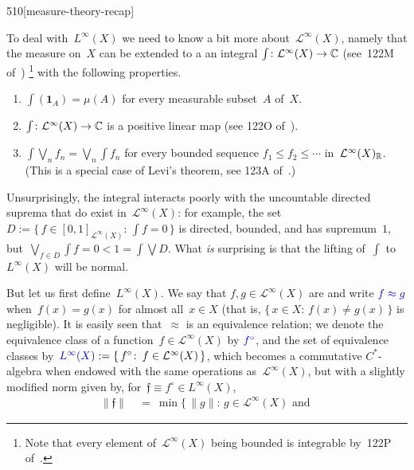 \begin{parsec}{510}[measure-theory-recap]
\begin{point}{30}
\end{point}
\begin{point}{40}%
To deal with~$L^\infty(X)$
we need to know a bit more about~$\mathcal{L}^\infty(X)$,
namely that the measure on~$X$ can be extended to a
an integral $\int\colon \mathcal{L}^\infty(X)\to \mathbb{C}$
(see~122M of~\cite{fremlin})%
\footnote{Note that every element of~$\mathcal{L}^\infty(X)$
being bounded is integrable by~122P of~\cite{fremlin}.}
with the following properties.
\begin{enumerate}
\item
$\int(\mathbf{1}_A) = \mu(A)$
for every measurable subset~$A$ of~$X$.
\item
$\int\colon \mathcal{L}^\infty(X)\to \mathbb{C}$
is a positive linear map
(see 122O of~\cite{fremlin}).
\item
$\int \bigvee_n f_n = \bigvee_n \int f_n$
for every bounded sequence
$f_1\leq f_2\leq \dotsb$
in~$\mathcal{L}^\infty(X)_{\mathbb{R}}$.
(This is a special case
of Levi's theorem, see 123A of~\cite{fremlin}.)
\end{enumerate}
Unsurprisingly, the integral
interacts poorly
with the uncountable directed suprema
that do exist in~$\mathcal{L}^\infty(X)$:
for example, the set~$D:=\{\,f\in [0,1]_{\mathcal{L}^\infty(X)}\colon \,
\int f = 0\,\}$
is directed, bounded, and has supremum~$1$,
but~$\bigvee_{f\in D} \int f=0 < 1=\int \bigvee D$.
What \emph{is} surprising
is that the lifting of~$\int$
to~$L^\infty(X)$ will be normal.
\end{point}
\begin{point}{50}%
But let us first define~$L^\infty(X)$.
We say that $f,g\in \mathcal{L}^\infty(X)$
are 
and write $\Define{f\approx g}$%
when~$f(x)=g(x)$ for almost all~$x\in X$
(that is, $\{\,x\in X\colon\, f(x)\neq g(x)\,\}$
is negligible).
It is easily seen that~$\approx$ is an equivalence relation;
we denote the equivalence class
of a function~$f\in \mathcal{L}^\infty(X)$
by $\Define{f^\circ}$,%
and
the set of equivalence classes by~$\Define{L^\infty(X)}
:= \{\, f^\circ\colon\, f\in \mathcal{L}^\infty(X)\,\}$,
which
becomes a commutative $C^*$-algebra
when
endowed with the same operations
as~$\mathcal{L}^\infty(X)$, but with
a slightly modified norm given by,
for~$\mathfrak{f}\equiv f^\circ \in L^\infty(X)$,
\begin{alignat*}{3}
	\|\mathfrak{f}\| \ &= \ 
\min\{\, \|g\|\colon \, g\in\mathcal{L}^\infty(X)\text{ and }

\end{alignat*}
\end{point}
\end{parsec}
